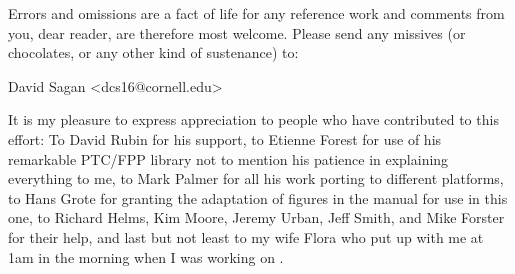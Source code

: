 Errors and omissions are a fact of life for any reference work and
comments from you, dear reader, are therefore most welcome. Please
send any missives (or chocolates, or any other kind of sustenance) to:
\begin{example}
  David Sagan <dcs16@cornell.edu>
\end{example}

It is my pleasure to express appreciation to people who have
contributed to this effort: To David Rubin for his support, to Etienne
Forest for use of his remarkable PTC/FPP library not to mention his
patience in explaining everything to me, to Mark Palmer for all his
work porting \bmad to different platforms, to Hans Grote for granting
the adaptation of figures in the \mad manual for use in this one, to
Richard Helms, Kim Moore, Jeremy Urban, Jeff Smith, and Mike Forster
for their help, and last but not least to my wife Flora who put up
with me at 1am in the morning when I was working on \bmad.

